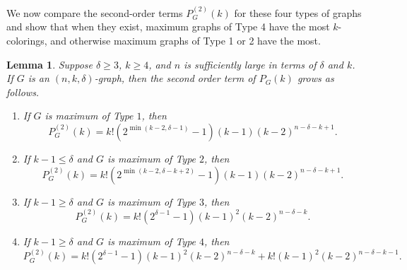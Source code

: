 \documentclass[11pt]{article}
\theoremstyle{plain}
\newtheorem{lemma}[theorem]{Lemma}
\theoremstyle{definition}
\theoremstyle{remark}
\begin{document}
We now compare the second-order terms $P_G^{(2)}(k)$ for these four types of graphs and show that when they exist, maximum graphs of Type 4 have the most $k$-colorings, and otherwise maximum graphs of Type 1 or 2 have the most.

\begin{lemma}\label{lem:second-order}
Suppose $\delta \ge 3$, $k\ge 4$, and $n$ is sufficiently large in terms of $\delta$ and $k$. If $G$ is an $(n,k,\delta)$-graph, then the second order term of $P_G(k)$ grows as follows.
\begin{enumerate}
    \item If $G$ is maximum of Type $1$, then
        \[ P_G^{(2)}(k) = k!(2^{\min(k-2, \delta - 1)} - 1)(k-1)(k-2)^{n-\delta -k + 1}.\]
    \item If $k-1 \le \delta$ and $G$ is maximum of Type $2$, then
        \[ P_G^{(2)}(k) = k!(2^{\min(k-2, \delta - k + 2)} - 1) (k-1)(k-2)^{n-\delta-k+1}.\]
    \item If $k-1 \ge \delta$ and $G$ is maximum of Type $3$, then
        \[ P_G^{(2)}(k) = k!(2^{\delta - 1} - 1)(k-1)^2(k-2)^{n-\delta - k}. \]
    \item If $k-1 \ge \delta$ and $G$ is maximum of Type $4$, then
        \[ P_G^{(2)}(k) = k!(2^{\delta -1} - 1)(k-1)^2(k-2)^{n-\delta-k} + k!(k-1)^2(k-2)^{n-\delta-k-1}. \]
\end{enumerate}
\end{lemma}
\end{document}
